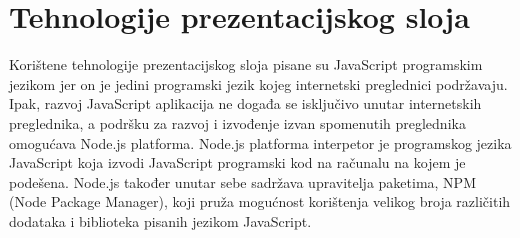 \documentclass[times, utf8, zavrsni]{fer}
\begin{document}
		\section{Tehnologije prezentacijskog sloja}
		Korištene tehnologije prezentacijskog sloja pisane su JavaScript programskim jezikom jer on je jedini programski jezik kojeg internetski preglednici podržavaju. Ipak, razvoj JavaScript aplikacija ne događa se isključivo unutar internetskih preglednika, a podršku za razvoj i izvođenje izvan spomenutih preglednika omogućava Node.js platforma. Node.js platforma interpetor je programskog jezika JavaScript koja izvodi JavaScript programski kod na računalu na kojem je podešena. Node.js također unutar sebe sadržava upravitelja paketima, NPM (Node Package Manager), koji pruža mogućnost korištenja velikog broja različitih dodataka i biblioteka pisanih jezikom JavaScript.
		
\end{document}
